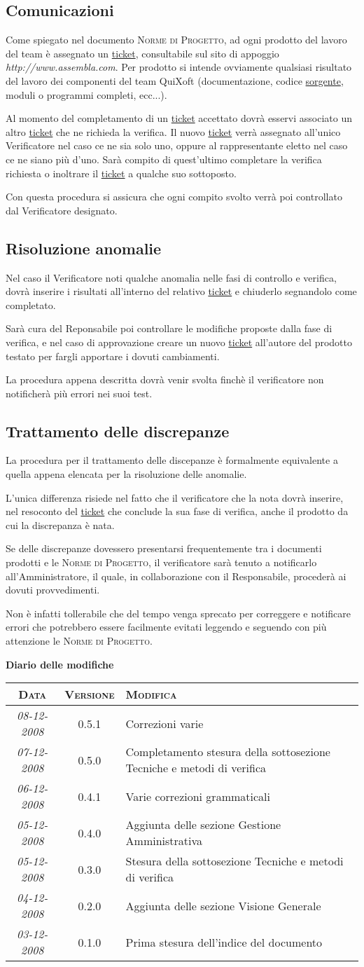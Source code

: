 \documentclass[11pt,a4paper]{article}
\newcommand{\modifiche} 
{
\newpage
\begin{center}
\textbf{Diario delle modifiche} \\
\bigskip
\begin{tabular}{|c|c|p{0.62\textwidth}|}
\hline
\textsc{Data} & \textsc{Versione} & \textsc{Modifica} \\
\hline
\hline
\textit{08-12-2008} & 0.5.1 & Correzioni varie  \\
\hline
\textit{07-12-2008} & 0.5.0 & Completamento stesura della sottosezione Tecniche e metodi di verifica  \\
\hline
\textit{06-12-2008} & 0.4.1 & Varie correzioni grammaticali  \\
\hline
\textit{05-12-2008} & 0.4.0 & Aggiunta delle sezione Gestione Amministrativa  \\
\hline
\textit{05-12-2008} & 0.3.0 & Stesura della sottosezione Tecniche e metodi di verifica  \\
\hline
\textit{04-12-2008} & 0.2.0 & Aggiunta delle sezione Visione Generale  \\
\hline
\textit{03-12-2008} & 0.1.0 & Prima stesura dell'indice del documento \\
\hline
\end{tabular}
\end{center}
}
\begin{document}
\subsection{Comunicazioni}
Come spiegato nel documento \textsc{Norme di Progetto}, ad ogni prodotto del lavoro del team è assegnato un \underline{ticket}, consultabile sul sito di appoggio \textit{http://www.assembla.com}. Per prodotto si intende ovviamente qualsiasi risultato del lavoro dei componenti del team QuiXoft (documentazione, codice \underline{sorgente}, moduli o programmi completi, ecc...).

Al momento del completamento di un \underline{ticket} accettato dovrà esservi associato un altro \underline{ticket} che ne richieda la verifica. Il nuovo \underline{ticket} verrà assegnato all'unico Verificatore nel caso ce ne sia solo uno, oppure al rappresentante eletto nel caso ce ne siano più d'uno. Sarà compito di quest'ultimo completare la verifica richiesta o inoltrare il \underline{ticket} a qualche suo sottoposto.

Con questa procedura si assicura che ogni compito svolto verrà poi controllato dal Verificatore designato.
\subsection{Risoluzione anomalie}
Nel caso il Verificatore noti qualche anomalia nelle fasi di controllo e verifica, dovrà inserire i risultati all'interno del relativo \underline{ticket} e chiuderlo segnandolo come completato.

Sarà cura del Reponsabile poi controllare le modifiche proposte dalla fase di verifica, e nel caso di approvazione creare un nuovo \underline{ticket} all'autore del prodotto testato per fargli apportare i dovuti cambiamenti.

La procedura appena descritta dovrà venir svolta finchè il verificatore non notificherà più errori nei suoi test.
\subsection{Trattamento delle discrepanze}
La procedura per il trattamento delle discepanze è formalmente equivalente a quella appena elencata per la risoluzione delle anomalie.

L'unica differenza risiede nel fatto che il verificatore che la nota dovrà inserire, nel resoconto del \underline{ticket} che conclude la sua fase di verifica, anche il prodotto da cui la discrepanza è nata.

Se delle discrepanze dovessero presentarsi frequentemente tra i documenti prodotti e le \textsc{Norme di Progetto}, il verificatore sarà tenuto a notificarlo all'Amministratore, il quale, in collaborazione con il Responsabile, procederà ai dovuti provvedimenti.

Non è infatti tollerabile che del tempo venga sprecato per correggere e notificare errori che potrebbero essere facilmente evitati leggendo e seguendo con più attenzione le \textsc{Norme di Progetto}.
\modifiche
\end{document}
